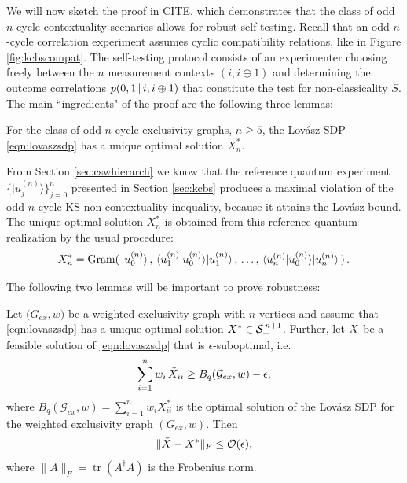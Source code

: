 We will now sketch the proof in CITE, which demonstrates that the class of odd $n$-cycle contextuality scenarios allows for robust self-testing. Recall that an odd $n$-cycle correlation experiment assumes cyclic compatibility relations, like in Figure \ref{fig:kcbscompat}. The self-testing protocol consists of an experimenter choosing freely between the $n$ measurement contexts $(i,i\oplus1)$ and determining the outcome correlations $p(0,1\thinspace\vert\thinspace i,i\oplus 1)$ that constitute the test for non-classicality $S$. The main ``ingredients" of the proof are the following three lemmas:

\begin{lemma}[CITE]
\label{lem:kcbsunique}
For the class of odd $n$-cycle exclusivity graphs, $n\geq5$, the Lovász SDP \ref{eqn:lovaszsdp} has a unique optimal solution $X^*_n$.   
\end{lemma}

From Section \ref{sec:cswhierarch} we know that the reference quantum experiment $\{\vert u_j^{(n)} \rangle \}_{j=0}^{n}$ presented in Section \ref{sec:kcbs} produces a maximal violation of the odd $n$-cycle KS non-contextuality inequality, because it attains the Lovász bound. The unique optimal solution $X^*_n$ is obtained from this reference quantum realization by the usual procedure:
\begin{equation*}
    X^*_n=\operatorname{Gram}(\thinspace\vert u_0^{(n)} \rangle\thinspace,\thinspace \langle u_1^{(n)} \vert u_0^{(n)} \rangle \vert u_1^{(n)} \rangle\thinspace,\thinspace\dots,\thinspace \langle u_n^{(n)} \vert u_0^{(n)} \rangle \vert u_n^{(n)} \rangle\thinspace)\thinspace.
\end{equation*}

The following two lemmas will be important to prove robustness:

\begin{lemma}[CITE]
\label{lem:epssuboptgram}
Let $\mathcal({G}_{ex},w)$ be a weighted exclusivity graph with $n$ vertices and assume that \ref{eqn:lovaszsdp} has a unique optimal solution $X^*\in \mathcal{S}_+^{\thinspace n+1}$. Further, let $\Tilde{X}$ be a feasible solution of \ref{eqn:lovaszsdp} that is $\epsilon$-suboptimal, i.e.\
\begin{equation*}
    \sum_{i=1}^n w_i\thinspace\Tilde{X}_{ii} \geq B_{q}(\mathcal{G}_{ex},w)-\epsilon,
\end{equation*}
where $B_{q}(\mathcal{G}_{ex},w)=\sum_{i=1}^n w_i X_{ii}^*$ is the optimal solution of the Lovász SDP for the weighted exclusivity graph $({G}_{ex},w)$.
Then
\begin{equation*}
\|\Tilde{X}-X^*\|_F \leq \mathcal{O}(\epsilon),
\end{equation*}
where $\|A\|_F=\operatorname{tr}(A^{\dag}A)$ is the Frobenius norm.
\end{lemma}

